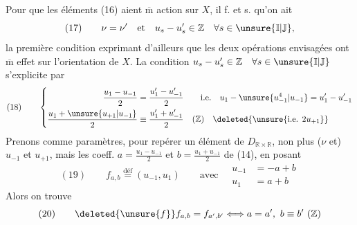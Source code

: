 Pour que les éléments (16) aient $\overline{\mathrm m}$ action sur $X$, il f. et s. qu'on ait
\[
(17)\qquad \nu=\nu'\quad\text{et}\quad u_s-u'_s\in\mathbb Z\quad\forall s\in\unsure{\mathbb I|\mathbb J},
\]
la première condition  exprimant d'ailleurs que les deux opérations envisagées ont $\overline{\mathrm m}$ effet sur l'orientation de $X$. La condition $u_s-u'_s\in\mathbb Z\quad\forall s\in\unsure{\mathbb I|\mathbb J}$ s'explicite par
\[
(18)\qquad\left\{\begin{aligned}
\frac{u_1-u_{-1}}2&=\frac{u'_1-u'_{-1}}2\qquad\text{i.e.}\quad u_1-\unsure{u_{-1}^{4}|u_{-1}}=u'_1-u'_{-1}\\
\frac{u_1+\unsure{u_{+1}|u_{-1}}}2&\equiv\frac{u'_1+u'_{-1}}2\quad(\mathbb Z)\quad\deleted{\unsure{\text{i.e. }2u_{+1}}}
\end{aligned}\right.
\]
 Prenons comme paramètres, pour repérer un élément  de $D_{\mathbb R\times\mathbb R}$, non plus ($\nu$ et) $u_{-1}$ et $u_{+1}$, mais les coeff. $a=\frac{u_1-u_{-1}}2$ et $b=\frac{u_1+u_{-1}}2$ de (14), en posant
\[
(19)\qquad f_{a,b}\overset{\text{déf}}{=}(u_{-1},u_1)\qquad\text{avec}\quad\begin{aligned}u_{-1}&=-a+b\\u_1&=a+b\end{aligned}
\]
Alors on trouve
\[
(20)\qquad\deleted{\unsure{f}}f_{a,b}=f_{a',b'}\Longleftrightarrow a=a',\ b\equiv b'\ (\mathbb Z)
\]


